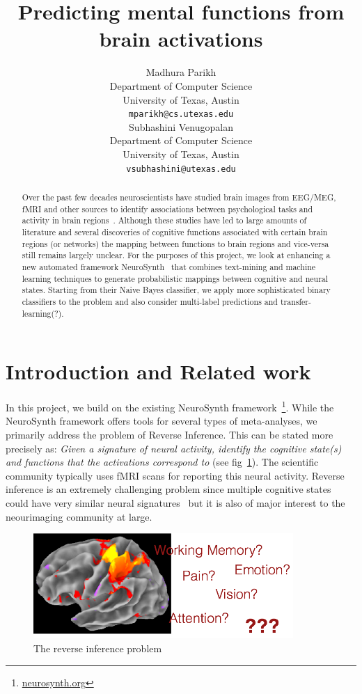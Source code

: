 \documentclass{article} %
\title{Predicting mental functions from brain activations}
\author{
Madhura Parikh\\
Department of Computer Science\\
University of Texas, Austin\\
\texttt{mparikh@cs.utexas.edu} \\
\And
Subhashini Venugopalan \\
Department of Computer Science\\
University of Texas, Austin\\
\texttt{vsubhashini@utexas.edu} \\
}
\begin{document}
\maketitle

\begin{abstract}
Over the past few decades neuroscientists have studied brain images from EEG/MEG, fMRI and other sources to identify associations between psychological tasks and activity in brain regions~\cite{PMSKBY12}.
Although these studies have led to large amounts of literature and several discoveries of cognitive functions associated with certain brain regions (or networks) the mapping between functions to brain regions and vice-versa still remains largely unclear. For the purposes of this project, we look at enhancing a new automated framework NeuroSynth~\cite{yarkoni2011large}  that combines text-mining and machine learning techniques to generate probabilistic mappings between cognitive and neural states. Starting from their Naive Bayes classifier, we apply more sophisticated binary classifiers to the problem and also consider multi-label predictions and transfer-learning(?).
\end{abstract}

\section{Introduction and Related work}
In this project, we build on the existing NeuroSynth framework~\footnote{\protect \url{neurosynth.org}}. While the NeuroSynth framework offers tools for several types of meta-analyses, we primarily address the problem of Reverse Inference.  This can be stated more precisely as: \emph{Given a signature of neural activity,  identify  the cognitive state(s) and functions that the activations correspond to} (see fig~\ref{fig:revinf}). The scientific community typically uses fMRI scans for reporting this neural activity. Reverse inference is an extremely challenging problem since multiple cognitive states could have very similar neural signatures~\cite{yarkoni2011large} but it is also of major interest to the neourimaging community at large.

\begin{figure}[h]
\begin{center}
\includegraphics[height=4cm]{revinf.png}
\end{center}
\caption{The reverse inference problem}
\label{fig:revinf}
\end{figure}
\end{document}
